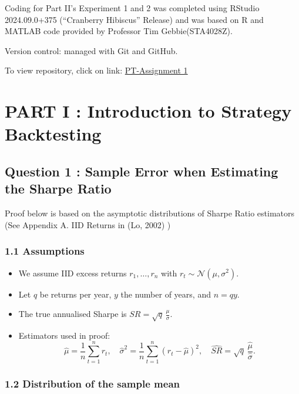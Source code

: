 \documentclass[
  12pt,
]{article}
\begin{document}
Coding for Part II's Experiment 1 and 2 was completed using RStudio
2024.09.0+375 (``Cranberry Hibiscus'' Release) and was based on R and
MATLAB code provided by Professor Tim Gebbie(STA4028Z).

Version control: managed with Git and GitHub.

To view repository, click on link:
\href{https://github.com/NesanNaidoo/Portfolio-Theory-Assignment-1-Backtesting}{PT-Assignment
1}

\newpage

\section{PART I : Introduction to Strategy
Backtesting}\label{part-i-introduction-to-strategy-backtesting}

\subsection{Question 1 : Sample Error when Estimating the Sharpe
Ratio}\label{question-1-sample-error-when-estimating-the-sharpe-ratio}

Proof below is based on the asymptotic distributions of Sharpe Ratio
estimators (See Appendix A. IID Returns in (Lo, 2002) )

\subsubsection{1.1 Assumptions}\label{assumptions}

\begin{itemize}
\item
  We assume IID excess returns \(r_1,\dots,r_n\) with
  \(r_t \sim \mathcal{N}(\mu,\sigma^2).\)
\item
  Let \(q\) be returns per year, \(y\) the number of years, and
  \(n=qy\).
\item
  The true annualised Sharpe is \(SR=\sqrt{q}\,\frac{\mu}{\sigma}.\)
\item
  Estimators used in proof: \[
  \widehat\mu=\frac{1}{n}\sum_{t=1}^n r_t,\quad
  \widehat\sigma^2=\frac{1}{n}\sum_{t=1}^n (r_t-\widehat\mu)^2,\quad
  \widehat{SR}=\sqrt{q}\,\frac{\widehat\mu}{\widehat\sigma}.
  \]
\end{itemize}

\subsubsection{1.2 Distribution of the sample
mean}\label{distribution-of-the-sample-mean}
\end{document}
